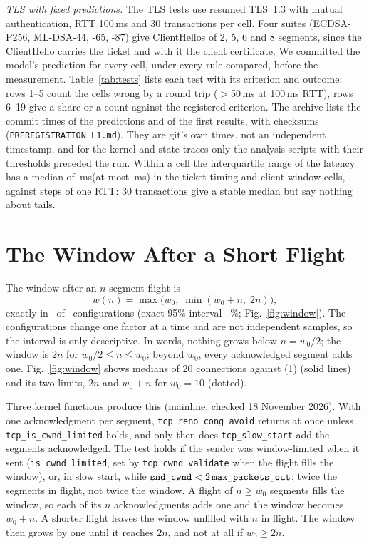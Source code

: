 \documentclass[sigconf,9pt,nonacm]{acmart}
\newcommand{\ms}{\,ms\xspace}
\begin{document}
\emph{TLS with fixed predictions.} The TLS tests use resumed TLS~1.3 with mutual authentication, RTT 100\ms and 30 transactions per cell. Four suites (ECDSA-P256, ML-DSA-44, -65, -87) give ClientHellos of 2, 5, 6 and 8 segments, since the ClientHello carries the ticket and with it the client certificate. We committed the model's prediction for every cell, under every rule compared, before the measurement. Table~\ref{tab:tests} lists each test with its criterion and outcome: rows 1--5 count the cells wrong by a round trip ($>$50\ms at 100\ms RTT), rows 6--19 give a share or a count against the registered criterion. The archive lists the commit times of the predictions and of the first results, with checksums (\texttt{PREREGISTRATION\_L1.md}). They are git's own times, not an independent timestamp, and for the kernel and state traces only the analysis scripts with their thresholds preceded the run. Within a cell the interquartile range of the latency has a median of \SpreadMed\ms (at most \SpreadMax\ms) in the ticket-timing and client-window cells, against steps of one RTT: 30 transactions give a stable median but say nothing about tails.

\section{The Window After a Short Flight}\label{sec:window}
The window after an $n$-segment flight is
\begin{equation}
w(n)=\max\bigl(w_0,\;\min(w_0+n,\;2n)\bigr),
\end{equation}
exactly in \NExact\ of \NCfg\ configurations (exact 95\% interval \CiWinLo--\CiWinHi\%; Fig.~\ref{fig:window}). The configurations change one factor at a time and are not independent samples, so the interval is only descriptive. In words, nothing grows below $n=w_0/2$; the window is $2n$ for $w_0/2\le n\le w_0$; beyond $w_0$, every acknowledged segment adds one. Fig.~\ref{fig:window} shows medians of 20 connections against (1) (solid lines) and its two limits, $2n$ and $w_0+n$ for $w_0=10$ (dotted).

Three kernel functions produce this (mainline, checked 18 November 2026). With one acknowledgment per segment, \texttt{tcp\_\allowbreak reno\_\allowbreak cong\_\allowbreak avoid} returns at once unless \texttt{tcp\_\allowbreak is\_\allowbreak cwnd\_\allowbreak limited} holds, and only then does \texttt{tcp\_\allowbreak slow\_\allowbreak start} add the segments acknowledged. The test holds if the sender was window-limited when it sent (\texttt{is\_\allowbreak cwnd\_\allowbreak limited}, set by \texttt{tcp\_\allowbreak cwnd\_\allowbreak validate} when the flight fills the window), or, in slow start, while $\texttt{snd\_\allowbreak cwnd}<2\,\texttt{max\_\allowbreak packets\_\allowbreak out}$: twice the segments in flight, not twice the window. A flight of $n\ge w_0$ segments fills the window, so each of its $n$ acknowledgments adds one and the window becomes $w_0+n$. A shorter flight leaves the window unfilled with $n$ in flight. The window then grows by one until it reaches $2n$, and not at all if $w_0\ge 2n$.
\end{document}

